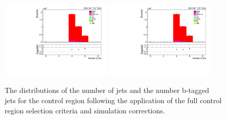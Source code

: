 \begin{figure}[tbp]
\centering
\includegraphics[width=0.47\textwidth]{figs/background-estimation/plots/unblinded/ttbar_control/numbJets_SingleTop_wMass_emu.pdf}
\includegraphics[width=0.47\textwidth]{figs/background-estimation/plots/unblinded/ttbar_control/numbJets_SingleTop_wMass_emu.pdf}
\caption{
The distributions of the number of jets and the number b-tagged jets for the \ttbar control region following the application of the full control region selection criteria and simulation corrections.
}
\label{fig:ttbarCR_nJets}
\end{figure}

